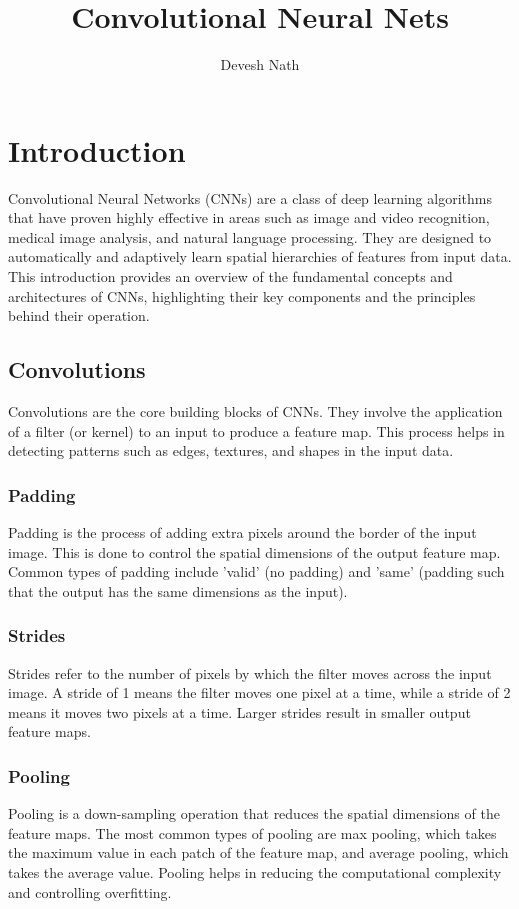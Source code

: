 \documentclass[12pt]{article}
\title{Convolutional Neural Nets}
\author{Devesh Nath}
\date{}
\begin{document}
\maketitle

\section{Introduction}
Convolutional Neural Networks (CNNs) are a class of deep learning algorithms that have proven highly effective in areas such as image and video recognition, medical image analysis, and natural language processing. They are designed to automatically and adaptively learn spatial hierarchies of features from input data. This introduction provides an overview of the fundamental concepts and architectures of CNNs, highlighting their key components and the principles behind their operation.

\subsection{Convolutions}
Convolutions are the core building blocks of CNNs. They involve the application of a filter (or kernel) to an input to produce a feature map. This process helps in detecting patterns such as edges, textures, and shapes in the input data.

\subsubsection{Padding}
Padding is the process of adding extra pixels around the border of the input image. This is done to control the spatial dimensions of the output feature map. Common types of padding include 'valid' (no padding) and 'same' (padding such that the output has the same dimensions as the input).

\subsubsection{Strides}
Strides refer to the number of pixels by which the filter moves across the input image. A stride of 1 means the filter moves one pixel at a time, while a stride of 2 means it moves two pixels at a time. Larger strides result in smaller output feature maps.

\subsubsection{Pooling}
Pooling is a down-sampling operation that reduces the spatial dimensions of the feature maps. The most common types of pooling are max pooling, which takes the maximum value in each patch of the feature map, and average pooling, which takes the average value. Pooling helps in reducing the computational complexity and controlling overfitting.
\end{document}
